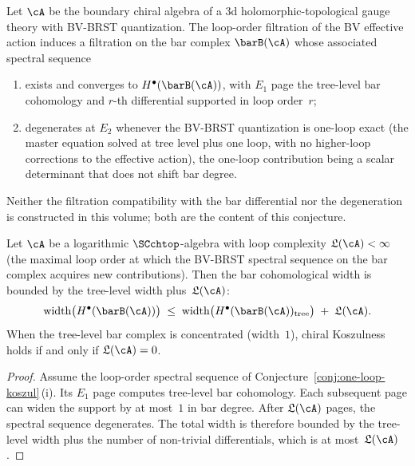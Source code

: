 \begin{conjecture}
\label{conj:one-loop-koszul}
Let\/ $\cA$ be the boundary chiral algebra of a 3d
holomorphic-topological gauge theory with BV-BRST quantization.
The loop-order filtration of the BV effective action induces a
filtration on the bar complex $\barB(\cA)$ whose associated
spectral sequence
\begin{enumerate}[label=\textup{(\roman*)}]
\item exists and converges to $H^\bullet(\barB(\cA))$, with $E_1$
 page the tree-level bar cohomology and $r$-th differential
 supported in loop order~$r$;
\item degenerates at $E_2$ whenever the BV-BRST quantization is
 one-loop exact \textup{(}the master equation solved at tree level
 plus one loop, with no higher-loop corrections to the effective
 action\textup{)}, the one-loop contribution being a scalar
 determinant that does not shift bar degree.
\end{enumerate}
Neither the filtration compatibility with the bar differential nor
the degeneration is constructed in this volume; both are the
content of this conjecture.
\end{conjecture}

\begin{theorem}
\label{thm:width-bound}
Let\/ $\cA$ be a logarithmic $\SCchtop$-algebra with loop
complexity\/ $\mathfrak{L}(\cA) < \infty$
\textup{(}the maximal loop order at which the BV-BRST
spectral sequence on the bar complex acquires new
contributions\textup{)}.
Then the bar cohomological width is bounded by the tree-level
width plus\/~$\mathfrak{L}(\cA)$:
\[
\mathrm{width}\bigl(H^\bullet(\barB(\cA))\bigr)
\;\le\;
\mathrm{width}\bigl(H^\bullet(\barB(\cA))_{\mathrm{tree}}\bigr)
\;+\; \mathfrak{L}(\cA).
\]
When the tree-level bar complex is concentrated
\textup{(}width~$1$\textup{)}, chiral Koszulness holds if
and only if\/ $\mathfrak{L}(\cA) = 0$.
\end{theorem}

\begin{proof}
Assume the loop-order spectral sequence of
Conjecture~\ref{conj:one-loop-koszul}\,(i). Its $E_1$ page computes
tree-level bar cohomology. Each subsequent page can widen the support
by at most~$1$ in bar degree. After $\mathfrak{L}(\cA)$
pages, the spectral sequence degenerates. The total width
is therefore bounded by the tree-level width plus the number
of non-trivial differentials, which is at
most~$\mathfrak{L}(\cA)$.
\end{proof}

